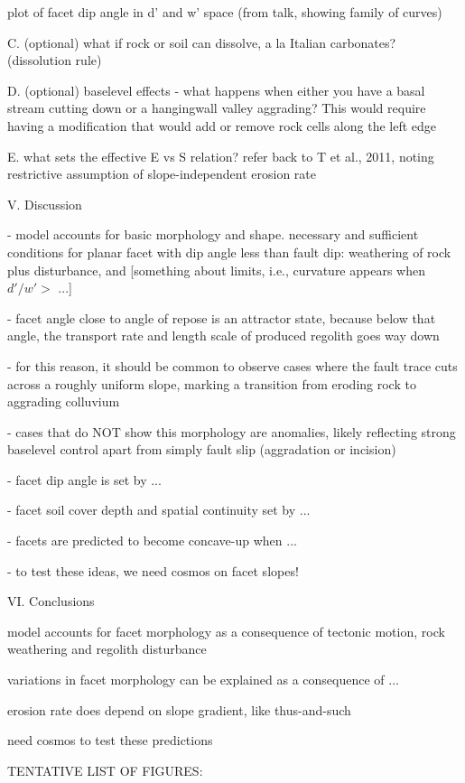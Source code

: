 plot of facet dip angle in d' and w' space (from talk, showing family of curves)

C. (optional) what if rock or soil can dissolve, a la Italian carbonates? (dissolution rule)

D. (optional) baselevel effects - what happens when either you have a basal stream cutting down or a hangingwall valley aggrading? This would require having a modification that would add or remove rock cells along the left edge

E. what sets the effective E vs S relation? refer back to T et al., 2011, noting restrictive assumption of slope-independent erosion rate


V. Discussion

- model accounts for basic morphology and shape. necessary and sufficient conditions for planar facet with dip angle less than fault dip: weathering of rock plus disturbance, and [something about limits, i.e., curvature appears when $d'/w' >$ ...]

- facet angle close to angle of repose is an attractor state, because below that angle, the transport rate and length scale of produced regolith goes way down

- for this reason, it should be common to observe cases where the fault trace cuts across a roughly uniform slope, marking a transition from eroding rock to aggrading colluvium

- cases that do NOT show this morphology are anomalies, likely reflecting strong baselevel control apart from simply fault slip (aggradation or incision)

- facet dip angle is set by ...

- facet soil cover depth and spatial continuity set by ...

- facets are predicted to become concave-up when ...

- to test these ideas, we need cosmos on facet slopes!


VI. Conclusions

model accounts for facet morphology as a consequence of tectonic motion, rock weathering and regolith disturbance

variations in facet morphology can be explained as a consequence of ...

erosion rate does depend on slope gradient, like thus-and-such

need cosmos to test these predictions



TENTATIVE LIST OF FIGURES:

